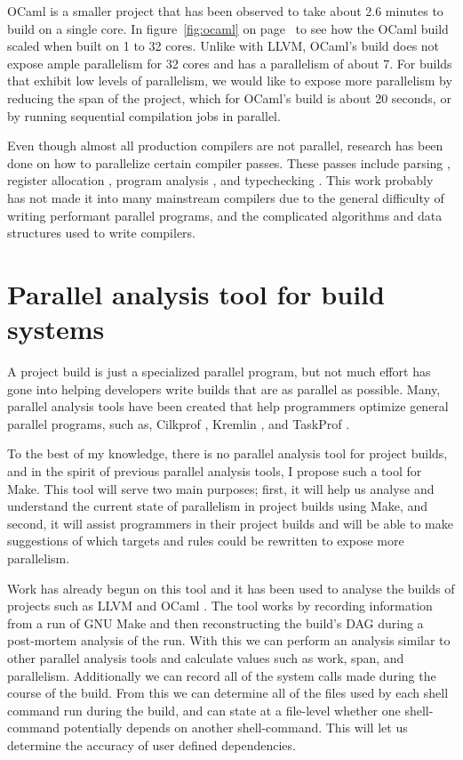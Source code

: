 \documentclass[10pt]{article}
\begin{document}
OCaml is a smaller project that has been observed to take about 2.6 minutes to build on a single core.
In figure~\ref{fig:ocaml} on page~\pageref{fig:ocaml} to see how the OCaml build scaled when built
on 1 to 32 cores.  Unlike with LLVM, OCaml's build does not expose ample parallelism for 32 cores and
has a parallelism of about 7.  For builds that exhibit low levels of parallelism, we would like to
expose more parallelism by reducing the span of the project, which for OCaml's build is about 20 seconds,
or by running sequential compilation jobs in parallel.


Even though almost all production compilers are not parallel, research
has been done on how to parallelize certain compiler passes.  These passes include
parsing \cite{barenghi2015parallel}, register allocation \cite{makowski1995achieving} \cite{zobel1993program}, program analysis \cite{kuper2014freeze}
\cite{mendez2010parallel} \cite{prabhu2011eigencfa} \cite{zobel1992program}, and typechecking \cite{newton2016parallel}.
This work probably has not made it into many mainstream compilers due to the general difficulty of writing
performant parallel programs, and the complicated algorithms and data structures used to write compilers.

\section{Parallel analysis tool for build systems}
\label{sec:build}

A project build is just a specialized parallel program, but not much effort has gone
into helping developers write builds that are as parallel as possible.  Many, parallel
analysis tools have been created that help programmers optimize general parallel programs,
such as, Cilkprof \cite{schardl2015cilkprof}, Kremlin \cite{garcia2011kremlin}, and TaskProf
\cite{yoga2017fast}.

To the best of my knowledge, there is no parallel analysis tool for project builds, and in the
spirit of previous parallel analysis tools, I propose such a tool for Make.  This tool will
serve two main purposes; first, it will help us analyse and understand the current state of
parallelism in project builds using Make, and second, it will assist programmers in their project
builds and will be able to make suggestions of which targets and rules could be rewritten to
expose more parallelism.

Work has already begun on this tool and it has been used to analyse the builds of
projects such as LLVM \cite{lattner2002llvm} and OCaml \cite{ocaml}.  The tool works by
recording information from a run of GNU Make and then reconstructing the build's DAG
during a post-mortem analysis of the run.  With this we can perform an analysis similar
to other parallel analysis tools and calculate values such as work, span, and
parallelism.
Additionally we can record all of the system calls made during the course of the build.
From this we can determine all of the files used by each shell command run during the build, and
can state at a file-level whether one shell-command potentially depends on another shell-command.
This will let us determine the accuracy of user defined dependencies.
\end{document}
